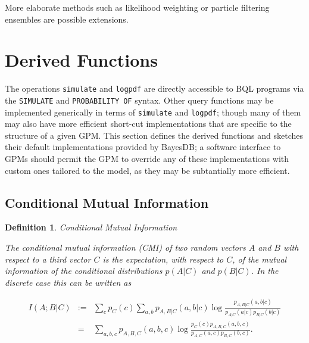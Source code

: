 \documentclass[10pt,letterpaper]{article}
\newtheorem{definition}{Definition}[section]
\begin{document}
More elaborate methods such as likelihood weighting or particle
filtering ensembles are possible extensions.

\section{Derived Functions}

The operations \texttt{simulate} and \texttt{logpdf} are directly
accessible to BQL programs via the \texttt{SIMULATE} and
\texttt{PROBABILITY OF} syntax.  Other query functions may be
implemented generically in terms of \texttt{simulate} and
\texttt{logpdf}; though many of them may also have more efficient
short-cut implementations that are specific to the structure of a
given GPM.  This section defines the derived functions and sketches
their default implementations provided by BayesDB; a software
interface to GPMs should permit the GPM to override any of these
implementations with custom ones tailored to the model, as they may be
subtantially more efficient.


\subsection{Conditional Mutual Information}

\begin{definition} Conditional Mutual Information 

The \emph{conditional mutual information} (CMI) of two random vectors $A$
and $B$ with respect to a third vector $C$ is the expectation, with
respect to $C$, of the mutual information of the conditional distributions
$p(A|C)$ and $p(B|C)$.  In the discrete case this can be written as

    \begin{eqnarray*}
    I(A;B|C) & := &
        \sum_c p_C(c) \sum_{a,b} p_{A,B|C}(a,b|c) \log
            \frac{p_{A,B|C}(a,b|c)}{p_{A|C}(a|c) p_{B|C}(b|c)} \\
    &=& \sum_{a,b,c} p_{A,B,C}(a,b,c) \log
            \frac{p_C(c) p_{A,B,C}(a,b,c)}{p_{A,C}(a,c) p_{B,C}(b,c)}.
    \end{eqnarray*}

\end{definition}

\end{document}
